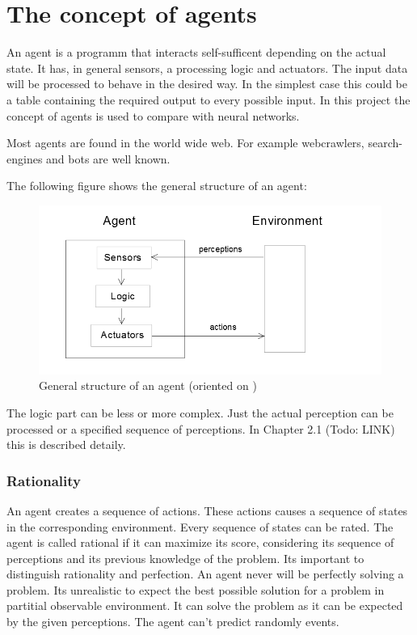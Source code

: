 \documentclass[10pt,a4paper,DIV=11]{scrreprt}
\begin{document}
\chapter{The concept of agents}
An agent is a programm that interacts self-sufficent depending on the actual state. It has, in general sensors, a processing logic and actuators. The input data will be processed to behave in the desired way. In the simplest case this could be a table containing the required output to every possible input. In this project the concept of agents is used to compare with neural networks.

Most agents are found in the world wide web. For example webcrawlers, search-engines and bots are well known.

The following figure shows the general structure of an agent:


\begin{center}
	\begin{figure}[H]
		\centering
		\includegraphics[width=1.0\textwidth,scale=1]{files/agent.png}  
		\caption{General structure of an agent (oriented on \cite{ki-book} )} 
		\label{fig:agent}
	\end{figure}
\end{center}

The logic part can be less or more complex. Just the actual perception can be processed or a specified sequence of perceptions. In Chapter 2.1 (Todo: LINK) this is described detaily.

\subsection{Rationality}
An agent creates a sequence of actions. These actions causes a sequence of states in the corresponding environment. Every sequence of states can be rated. The agent is called rational if it can maximize its score, considering its sequence of perceptions and its previous knowledge of the problem. Its important to distinguish rationality and perfection. An agent never will be perfectly solving a problem. Its unrealistic to expect the best possible solution for a problem in partitial observable environment. It can solve the problem as it can be expected by the given perceptions. The agent can't predict randomly events.
\end{document}
